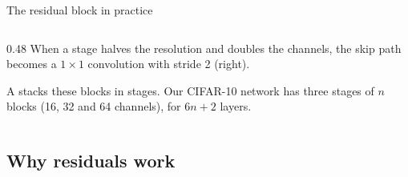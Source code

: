 \documentclass[11pt,aspectratio=169]{beamer}
\begin{document}
\begin{frame}{The residual block in practice}
\begin{columns}[c,onlytextwidth]
\begin{column}{0.48\textwidth}
            When a stage halves the resolution and doubles the channels, the
            skip path becomes a $1\times1$ convolution with stride 2 (right).

            A  stacks these blocks in stages. Our CIFAR-10
            network has three stages of $n$ blocks (16, 32 and 64 channels),
            for $6n+2$ layers.
        \end{column}
    \end{columns}


\end{frame}

\subsection{Why residuals work}
\end{document}
